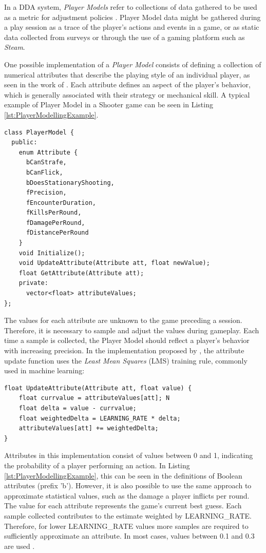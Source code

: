In a DDA system, \emph{Player Models} refer to collections of data gathered to be used as a metric for adjustment policies \cite{PHD_DynamicDifficultyAdjustment}. Player Model data might be gathered during a play session as a trace of the player's actions and events in a game, or as static data collected from surveys or through the use of a gaming platform such as \emph{Steam}.

One possible implementation of a \emph{Player Model} consists of defining a collection of numerical attributes that describe the playing style of an individual player, as seen in the work of \citet{BOOK_PlayerModeling}. Each attribute defines an aspect of the player's behavior, which is generally associated with their strategy or mechanical skill. A typical example of Player Model in a Shooter game can be seen in Listing \ref{lst:PlayerModellingExample}.

\begin{lstlisting}[caption={Example of a Player Model for a shooter game.},label={lst:PlayerModellingExample}]
class PlayerModel {
  public:
    enum Attribute {
      bCanStrafe,
      bCanFlick,
      bDoesStationaryShooting,
      fPrecision,
      fEncounterDuration,
      fKillsPerRound,
      fDamagePerRound,
      fDistancePerRound
    }
    void Initialize();
    void UpdateAttribute(Attribute att, float newValue);
    float GetAttribute(Attribute att);
    private:
      vector<float> attributeValues;
};
\end{lstlisting}

The values for each attribute are unknown to the game preceding a session. Therefore, it is necessary to sample and adjust the values during gameplay. Each time a sample is collected, the Player Model should reflect a player's behavior with increasing precision. In the implementation proposed by \citet{BOOK_PlayerModeling}, the attribute update function uses the \emph{Least Mean Squares} (LMS) training rule, commonly used in machine learning:

\begin{lstlisting}[caption={Implementation of attribute update using least mean squares.},label={lst:AttributeUpdate}]
float UpdateAttribute(Attribute att, float value) {
    float currvalue = attributeValues[att]; N
    float delta = value - currvalue;
    float weightedDelta = LEARNING_RATE * delta;
    attributeValues[att] += weightedDelta;
}
\end{lstlisting}

Attributes in this implementation consist of values between 0 and 1, indicating the probability of a player performing an action. In Listing \ref{lst:PlayerModellingExample}, this can be seen in the definitions of Boolean attributes (prefix 'b'). However, it is also possible to use the same approach to approximate statistical values, such as the damage a player inflicts per round. The value for each attribute represents the game's current best guess. Each sample collected contributes to the estimate weighted by LEARNING\_RATE. Therefore, for lower LEARNING\_RATE values more samples are required to sufficiently approximate an attribute. In most cases, values between 0.1 and 0.3 are used \cite{BOOK_PlayerModeling}.

